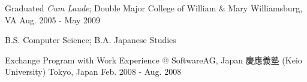 

\begin{cventries}

  \cventry
    {Graduated \emph{Cum Laude}; Double Major} %
    {College of William \& Mary} %
    {Williamsburg, VA} %
    {Aug. 2005 - May 2009} %
    {
      \begin{cvitems} %
        \item {B.S. Computer Science; B.A. Japanese Studies}
      \end{cvitems}
    }

  \cventry
    {Exchange Program with Work Experience @ SoftwareAG, Japan} %
    {慶應義塾  (Keio University)} %
    {Tokyo, Japan} %
    {Feb. 2008 - Aug. 2008} %
    {
      \begin{cvitems} %
      \end{cvitems}
    }

\end{cventries}
